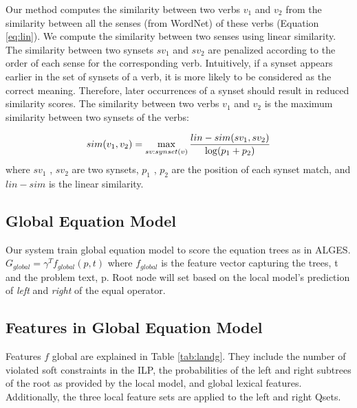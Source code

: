 \documentclass[document.tex]{subfiles}
\begin{document}
Our method computes the similarity between
two verbs $v_1$ and $v_2$ from the similarity between all
the senses (from WordNet) of these verbs (Equation \ref{eq:lin}). We compute the similarity between two
senses using linear similarity. The
similarity between two synsets $sv_1$ and $sv_2$ are penalized according to the order of each sense for the
corresponding verb. Intuitively, if a synset appears
earlier in the set of synsets of a verb, it is more
likely to be considered as the correct meaning.
Therefore, later occurrences of a synset should result in reduced similarity scores. The similarity
between two verbs $v_1$ and $v_2$ is the maximum similarity between two synsets of the verbs:

\begin{equation}
sim(v_1, v_2) = \max_{sv:synset(v)}^{} {lin-sim(sv_1, sv_2)\over \log(p_1+p_2)}
\label{eq:lin}
\end{equation}
where $sv_1$ , $sv_2$ are two synsets, $p_1$ , $p_2$ are the position of each synset match, and $lin-sim$ is the linear similarity.


\subsection{Global Equation Model}
Our system train global equation model to score the equation trees as in ALGES. $G_{global}= \gamma^T f_{global}(p, t)$ where  $f_{global}$   is the feature vector capturing the trees, t and the problem text, p. Root node will set based on the local model's prediction of \textit{left} and \textit{right} of the equal operator.
\subsection{Features in Global Equation Model}
Features $f$ global are explained in Table \ref{tab:landg}. They
include the number of violated soft constraints in the
ILP, the probabilities of the left and right subtrees of
the root as provided by the local model, and global
lexical features. Additionally, the three local feature
sets are applied to the left and right Qsets.
\end{document}
